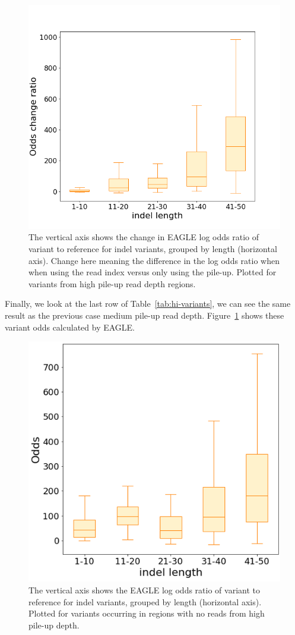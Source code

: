 \begin{figure}[H]
\centering
\includegraphics[width=0.6\columnwidth]{body/image/hi_odds_change.png}
\caption[high pile-up read depth odds change ratio]{The vertical axis shows the change in EAGLE log odds ratio of variant to reference for indel variants, grouped by length (horizontal axis).  Change here meaning the difference in the log odds ratio when when using the read index versus only using the pile-up.  Plotted for variants from high pile-up read depth regions.}
\label{hi_odds_change}
\end{figure}

Finally, we look at the last row of Table~\ref{tab:hi-variants}, we can see the same result as the previous case medium pile-up read depth. Figure~\ref{hi_odds_change} shows these variant odds calculated by EAGLE.

\begin{figure}[H]
\centering
\includegraphics[width=0.6\columnwidth]{body/image/hi_new_odds.png}
\caption[no reads with variants from high pile-up depth odds ratio]{The vertical axis shows the EAGLE log odds ratio of variant to reference for indel variants, grouped by length (horizontal axis).  Plotted for variants occurring in regions with no reads from high pile-up depth.}
\label{hi_new_odds}
\end{figure}


